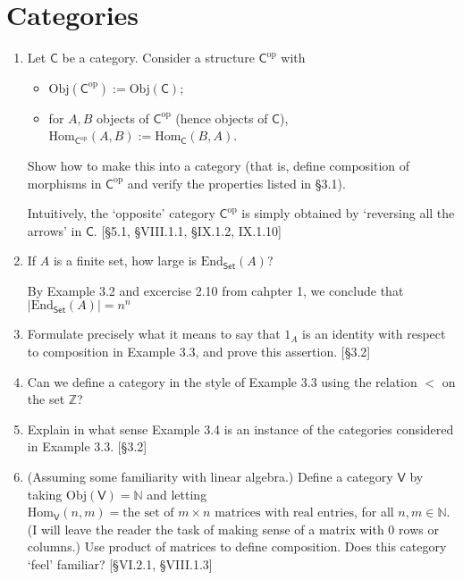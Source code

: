 \section{Categories}
\begin{enumerate}
    \item Let $\mathsf{C}$ be a category. Consider a structure $\mathsf{C}^{\mathrm{op}}$ with
          \begin{itemize}
              \item $\mathrm{Obj}(\mathsf{C}^{\mathrm{op}}) := \mathrm{Obj}(\mathsf{C})$;
              \item for $A, B$ objects of $\mathsf{C}^{\mathrm{op}}$ (hence objects of $\mathsf{C}$), $\mathrm{Hom}_{\mathsf{C}^{\mathrm{op}}}(A, B) := \mathrm{Hom}_{\mathsf{C}}(B, A)$.
          \end{itemize}
          Show how to make this into a category (that is, define composition of morphisms in $\mathsf{C}^{\mathrm{op}}$ and verify the properties listed in \S3.1).

          Intuitively, the `opposite' category $\mathsf{C}^{\mathrm{op}}$ is simply obtained by `reversing all the arrows' in $\mathsf{C}$. [\S5.1, \S VIII.1.1, \S IX.1.2, IX.1.10]

    \item If $A$ is a finite set, how large is $\mathrm{End}_{\mathsf{Set}}(A)$?
        \begin{solution}
            By Example 3.2 and excercise 2.10 from cahpter 1, we conclude that $|\mathrm{End}_{\mathsf{Set}}(A)|=n^n$
        \end{solution}
    \item Formulate precisely what it means to say that $1_A$ is an identity with respect to composition in Example 3.3, and prove this assertion. [\S3.2]

    \item Can we define a category in the style of Example 3.3 using the relation $<$ on the set $\mathbb{Z}$?

    \item Explain in what sense Example 3.4 is an instance of the categories considered in Example 3.3. [\S3.2]

    \item (Assuming some familiarity with linear algebra.) Define a category $\mathsf{V}$ by taking $\mathrm{Obj}(\mathsf{V}) = \mathbb{N}$ and letting $\mathrm{Hom}_{\mathsf{V}}(n, m) = \text{the set of } m \times n \text{ matrices with real entries}$, for all $n, m \in \mathbb{N}$. (I will leave the reader the task of making sense of a matrix with 0 rows or columns.) Use product of matrices to define composition. Does this category `feel' familiar? [\S VI.2.1, \S VIII.1.3]


\end{enumerate}
